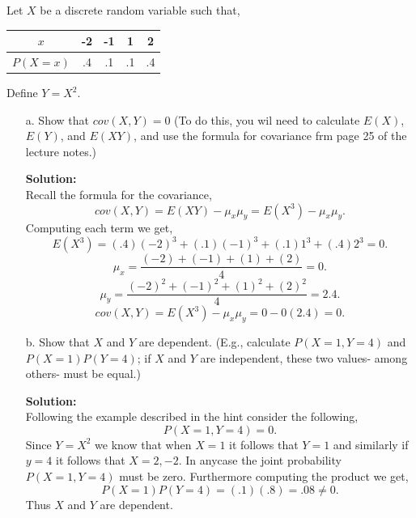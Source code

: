 \documentclass[12pt]{article}
\makeatletter
\theoremstyle{homework}
\newenvironment{exercise}[1]
{\def\@currentlabel{#1}\exercisecore}
{\endexercisecore}
\newcommand{\localhead}[1]{\par\smallskip\noindent\textbf{#1}\nobreak\\}%
\newcommand\solution{\localhead{Solution:}}
\makeatother
\begin{document}
\begin{exercise}{5} Let $X$ be a discrete random variable such that, 
  \begin{center}
    \begin{tabular}{c|| c c c c }
      $x$ & -2 & -1 & 1 & 2\\
      \hline
      $P(X = x)$ & .4 & .1 & .1 & .4\\
     \end{tabular}
    \end{center}
    Define $Y = X^2$. 
    \begin{enumerate}
      \item[a.] Show that $cov(X, Y) = 0$ (To do this, you wil need to calculate $E(X)$, $E(Y)$, and $E(XY)$, and use the formula for covariance frm page 
      25 of the lecture notes.)\\
      \solution Recall the formula for the covariance,
      \begin{equation*}
        cov(X, Y) = E(XY) - \mu_x\mu_y = E(X^3) - \mu_x\mu_y.
      \end{equation*}
      Computing each term we get, 
      \begin{equation*}
        E(X^3) = (.4)(-2)^3 + (.1)(-1)^3 + (.1)1^3 + (.4)2^3 = 0. 
      \end{equation*}
      \begin{equation*}
        \mu_x = \dfrac{(-2) + (-1) + (1) + (2)}{4} = 0.
      \end{equation*}
      \begin{equation*}
        \mu_y = \dfrac{(-2)^2 + (-1)^2 + (1)^2 + (2)^2}{4} = 2.4.
      \end{equation*}
      \begin{equation*}
        cov(X, Y) = E(X^3) - \mu_x\mu_y = 0 - 0(2.4) = 0.
      \end{equation*}
      \vspace{.15in}


      \item[b.] Show that $X$ and $Y$ are dependent. (E.g., calculate $P(X = 1, Y = 4)$ and $P(X = 1)P(Y = 4)$; if $X$ and $Y$
      are independent, these two values- among others- must be equal.)\\
      \solution Following the example described in the hint consider the following, 
      \begin{equation*}
        P(X = 1, Y = 4) = 0.
      \end{equation*}
      Since $Y = X^2$ we know that when $X = 1$ it follows that $Y = 1$ and similarly if $y = 4$ it follows that $X = 2,-2$. In anycase 
      the joint probability $P(X = 1, Y = 4)$ must be zero. Furthermore computing the product we get,
      \begin{equation*}
        P(X = 1)P(Y = 4) = (.1)(.8) = .08 \neq 0.
      \end{equation*}
      Thus $X$ and $Y$ are dependent.
    \end{enumerate}
  
  
\end{exercise}
\end{document}
